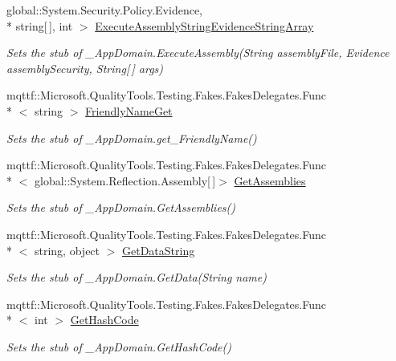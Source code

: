 \begin{DoxyCompactItemize}
global\-::\-System.\-Security.\-Policy.\-Evidence, \\*
string\mbox{[}$\,$\mbox{]}, int $>$ \hyperlink{class_system_1_1_fakes_1_1_stub___app_domain_a1271f2d80769beeb875fc0f5e01c4015}{Execute\-Assembly\-String\-Evidence\-String\-Array}
\begin{DoxyCompactList}\small\item\em Sets the stub of \-\_\-\-App\-Domain.\-Execute\-Assembly(\-String assembly\-File, Evidence assembly\-Security, String\mbox{[}$\,$\mbox{]} args)\end{DoxyCompactList}\item 
mqttf\-::\-Microsoft.\-Quality\-Tools.\-Testing.\-Fakes.\-Fakes\-Delegates.\-Func\\*
$<$ string $>$ \hyperlink{class_system_1_1_fakes_1_1_stub___app_domain_a308463f7857102643b35af473852bd75}{Friendly\-Name\-Get}
\begin{DoxyCompactList}\small\item\em Sets the stub of \-\_\-\-App\-Domain.\-get\-\_\-\-Friendly\-Name()\end{DoxyCompactList}\item 
mqttf\-::\-Microsoft.\-Quality\-Tools.\-Testing.\-Fakes.\-Fakes\-Delegates.\-Func\\*
$<$ global\-::\-System.\-Reflection.\-Assembly\mbox{[}$\,$\mbox{]}$>$ \hyperlink{class_system_1_1_fakes_1_1_stub___app_domain_a0f0f243182430533e13dc4e9bff41299}{Get\-Assemblies}
\begin{DoxyCompactList}\small\item\em Sets the stub of \-\_\-\-App\-Domain.\-Get\-Assemblies()\end{DoxyCompactList}\item 
mqttf\-::\-Microsoft.\-Quality\-Tools.\-Testing.\-Fakes.\-Fakes\-Delegates.\-Func\\*
$<$ string, object $>$ \hyperlink{class_system_1_1_fakes_1_1_stub___app_domain_a1ec31889301e778c71ae0d85fa2cfcb5}{Get\-Data\-String}
\begin{DoxyCompactList}\small\item\em Sets the stub of \-\_\-\-App\-Domain.\-Get\-Data(\-String name)\end{DoxyCompactList}\item 
mqttf\-::\-Microsoft.\-Quality\-Tools.\-Testing.\-Fakes.\-Fakes\-Delegates.\-Func\\*
$<$ int $>$ \hyperlink{class_system_1_1_fakes_1_1_stub___app_domain_a5c0ff9ac38be96129be6e357e576bf22}{Get\-Hash\-Code}
\begin{DoxyCompactList}\small\item\em Sets the stub of \-\_\-\-App\-Domain.\-Get\-Hash\-Code()\end{DoxyCompactList}\item 

\end{DoxyCompactItemize}
